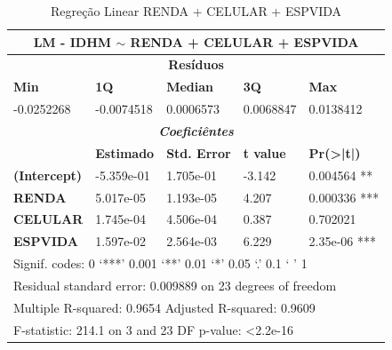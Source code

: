 \documentclass[journal]{IEEEtran}
\begin{document}
\begin{table}[H]
\centering
\caption{Regreção Linear RENDA + CELULAR + ESPVIDA}
\label{Regreção Linear RENDA + CELULAR + ESPVIDA}
\begin{tabular}{@{}lllll@{}}
\toprule
\multicolumn{5}{c}{\textbf{LM - IDHM $\sim$ RENDA + CELULAR + ESPVIDA}}                                          \\ \midrule
\multicolumn{5}{c}{\textbf{Resíduos}}                                                                            \\
\textbf{Min}         & \textbf{1Q}       & \textbf{Median}     & \textbf{3Q}      & \textbf{Max}                 \\
-0.0252268           & -0.0074518        & 0.0006573           & 0.0068847        & 0.0138412                    \\
\multicolumn{5}{c}{\textit{\textbf{Coeficiêntes}}}                                                               \\
\textit{\textbf{}}   & \textbf{Estimado} & \textbf{Std. Error} & \textbf{t value} & \textbf{Pr(\textgreater|t|)} \\
\textbf{(Intercept)} & -5.359e-01        & 1.705e-01           & -3.142           & 0.004564 **                  \\
\textbf{RENDA}       & 5.017e-05         & 1.193e-05           & 4.207            & 0.000336 ***                 \\
\textbf{CELULAR}     & 1.745e-04         & 4.506e-04           & 0.387            & 0.702021                     \\
\textbf{ESPVIDA}     & 1.597e-02         & 2.564e-03           & 6.229            & 2.35e-06 ***                 \\
\multicolumn{5}{l}{Signif. codes:     0 ‘***’ 0.001 ‘**’ 0.01 ‘*’ 0.05 ‘.’ 0.1 ‘ ’ 1}                            \\
\multicolumn{5}{l}{Residual standard error: 0.009889 on 23 degrees of freedom}                                   \\
\multicolumn{5}{l}{Multiple R-squared: 0.9654      Adjusted R-squared: 0.9609}                                   \\
\multicolumn{5}{l}{F-statistic: 214.1 on 3 and 23 DF      p-value: \textless 2.2e-16}                            \\ \bottomrule
\end{tabular}
\end{table}
\end{document}
